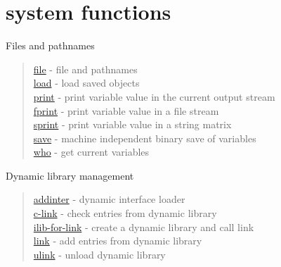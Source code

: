 \chapter*{system functions}

Files and pathnames
\begin{quote}
\noindent
\hyperlink{file}{file} - file and pathnames\\
\hyperlink{load}{load} - load saved objects\\
\hyperlink{print}{print} - print variable value  in the current output stream\\
\hyperlink{fprint}{fprint} - print variable value in a file stream\\
\hyperlink{sprint}{sprint} - print variable value in a string matrix \\
\hyperlink{save}{save} - machine independent binary save of variables\\
\hyperlink{who}{who} - get current variables\\
\end{quote}

Dynamic library management
\begin{quote}
\noindent 
\hyperlink{addinter}{addinter} - dynamic interface loader\\
\hyperlink{c_link}{c-link} - check entries from dynamic library \\
\hyperlink{ilib_for_link}{ilib-for-link} - create a dynamic library and call link \\
\hyperlink{link}{link} - add entries from dynamic library \\
\hyperlink{ulink}{ulink} - unload dynamic library \\
\end{quote}



  
  
 
 
 
 
